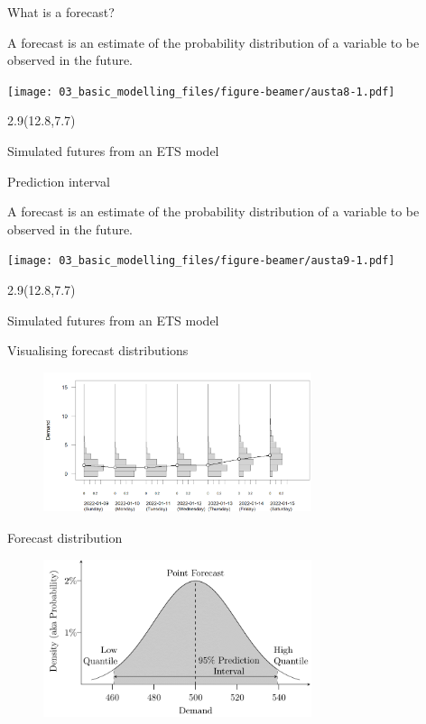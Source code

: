 \documentclass[
  14pt,
  ignorenonframetext,
  aspectratio=169,
]{beamer}
\def\forecast{\begin{alertblock}{}\fontsize{10}{11}\sf
 A forecast is an estimate of the probability distribution of a variable to be observed in the future.
\end{alertblock}}
\def\simfutures{\begin{textblock}{2.9}(12.8,7.7)
\begin{block}{}\fontsize{10}{11}\sf
Simulated futures from an ETS model
\end{block}\end{textblock}}
\begin{document}
\begin{frame}{What is a forecast?}
\protect\hypertarget{what-is-a-forecast-7}{}
\forecast

\texttt{[image: 03\_basic\_modelling\_files/figure-beamer/austa8-1.pdf]}

\simfutures
\end{frame}

\begin{frame}{Prediction interval}
\protect\hypertarget{prediction-interval}{}
\forecast

\texttt{[image: 03\_basic\_modelling\_files/figure-beamer/austa9-1.pdf]}

\simfutures
\end{frame}

\begin{frame}{Visualising forecast distributions}
\protect\hypertarget{visualising-forecast-distributions}{}
\begin{figure}

{\centering \includegraphics[width=0.7\textwidth,height=\textheight]{figs/daily_probabilistic_forecast.png}

}

\end{figure}
\end{frame}

\begin{frame}{Forecast distribution}
\protect\hypertarget{forecast-distribution}{}
\begin{figure}

{\centering \includegraphics[width=0.7\textwidth,height=\textheight]{figs/forecasts_probabilistic_perspective.png}

}

\end{figure}
\end{frame}
\end{document}
